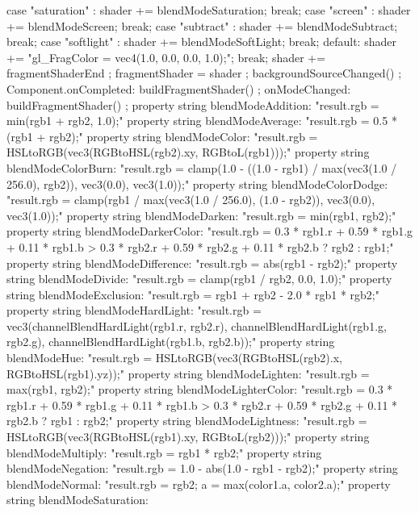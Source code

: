 \begin{thebookfilesourceone}[escapeinside={(*@}{@*)},
caption=GoodLuck,
title=\filesourcenumbernameone \thefilesourcenumber
]
{{{{            case "saturation" : shader += blendModeSaturation; break;
            case "screen" : shader += blendModeScreen; break;
            case "subtract" : shader += blendModeSubtract; break;
            case "softlight" : shader += blendModeSoftLight; break;
            default: shader += "gl_FragColor = vec4(1.0, 0.0, 0.0, 1.0);"; break; }
            shader += fragmentShaderEnd ;
            fragmentShader = shader ;
            backgroundSourceChanged() ; }
        Component.onCompleted: {buildFragmentShader() ; }
        onModeChanged: {buildFragmentShader() ;}
        property string blendModeAddition: "result.rgb = min(rgb1 + rgb2, 1.0);"
        property string blendModeAverage: "result.rgb = 0.5 * (rgb1 + rgb2);"
        property string blendModeColor: "result.rgb = HSLtoRGB(vec3(RGBtoHSL(rgb2).xy, RGBtoL(rgb1)));"
        property string blendModeColorBurn:
        "result.rgb = clamp(1.0 - ((1.0 - rgb1) / max(vec3(1.0 / 256.0), rgb2)), vec3(0.0), vec3(1.0));"
        property string blendModeColorDodge:
        "result.rgb = clamp(rgb1 / max(vec3(1.0 / 256.0), (1.0 - rgb2)), vec3(0.0), vec3(1.0));"
        property string blendModeDarken: "result.rgb = min(rgb1, rgb2);"
        property string blendModeDarkerColor:
        "result.rgb = 0.3 * rgb1.r + 0.59 * rgb1.g + 0.11 * rgb1.b > 0.3 * rgb2.r + 0.59 * rgb2.g + 0.11 * rgb2.b ? rgb2 : rgb1;"
        property string blendModeDifference: "result.rgb = abs(rgb1 - rgb2);"
        property string blendModeDivide: "result.rgb = clamp(rgb1 / rgb2, 0.0, 1.0);"
        property string blendModeExclusion:
        "result.rgb = rgb1 + rgb2 - 2.0 * rgb1 * rgb2;"
        property string blendModeHardLight:
        "result.rgb = vec3(channelBlendHardLight(rgb1.r, rgb2.r), channelBlendHardLight(rgb1.g, rgb2.g), channelBlendHardLight(rgb1.b, rgb2.b));"
        property string blendModeHue:
        "result.rgb = HSLtoRGB(vec3(RGBtoHSL(rgb2).x, RGBtoHSL(rgb1).yz));"
        property string blendModeLighten: "result.rgb = max(rgb1, rgb2);"
        property string blendModeLighterColor:
        "result.rgb = 0.3 * rgb1.r + 0.59 * rgb1.g + 0.11 * rgb1.b > 0.3 * rgb2.r + 0.59 * rgb2.g + 0.11 * rgb2.b ? rgb1 : rgb2;"
        property string blendModeLightness:
        "result.rgb = HSLtoRGB(vec3(RGBtoHSL(rgb1).xy, RGBtoL(rgb2)));"
        property string blendModeMultiply: "result.rgb = rgb1 * rgb2;"
        property string blendModeNegation: "result.rgb = 1.0 - abs(1.0 - rgb1 - rgb2);"
        property string blendModeNormal:
        "result.rgb = rgb2; a = max(color1.a, color2.a);"
        property string blendModeSaturation:
}}
\end{thebookfilesourceone}
